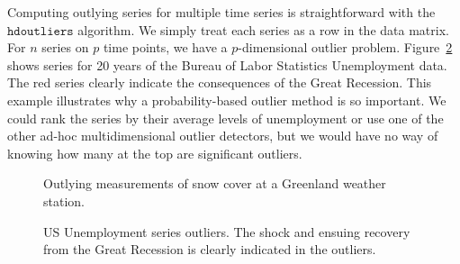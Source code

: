 \documentclass[12pt]{article}
\begin{document}
Computing outlying series for multiple time series is straightforward with the $\mathtt{hdoutliers}$ algorithm. We simply treat each series as a row in the data matrix. For $n$ series on $p$ time points, we have a $p$-dimensional outlier problem. Figure~\ref{fig:unemployment} shows series for 20 years of the Bureau of Labor Statistics Unemployment data. The red series clearly indicate the consequences of the Great Recession. This example illustrates why a probability-based outlier method is so important. We could rank the series by their average levels of unemployment or use one of the other ad-hoc multidimensional outlier detectors, but we would have no way of knowing how many at the top are significant outliers. 

\begin{figure}[h]
\caption{\label{fig:snow}  Outlying measurements of snow cover at a Greenland weather station.}
\end{figure}

\begin{figure}[h]
\caption{\label{fig:unemployment}  US Unemployment series outliers. The shock and ensuing recovery from the Great Recession is clearly indicated in the outliers.}
\end{figure}
\end{document}
